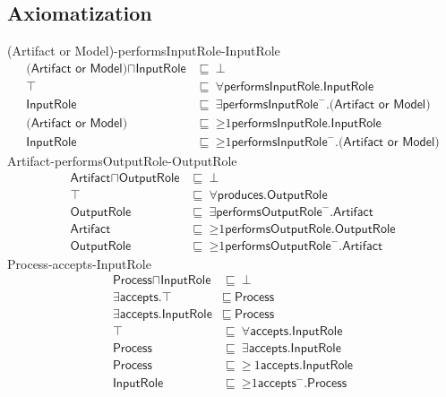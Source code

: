 \subsection{Axiomatization}
\label{axs:2b}
\textsf{(Artifact or Model)}-\textsf{performsInputRole}-\textsf{InputRole}
\begin{align}
\textsf{(Artifact or Model)} \sqcap \textsf{InputRole} &\sqsubseteq~\bot \\ %
\textsf{$\top$} &\sqsubseteq~\forall\textsf{performsInputRole.InputRole} \\ %
\textsf{InputRole} &\sqsubseteq~\exists\textsf{performsInputRole}^-\textsf{.(Artifact or Model)} \\ %
\textsf{(Artifact or Model)} &\sqsubseteq~\mathord{\geq}1\textsf{performsInputRole.InputRole} \\ %
\textsf{InputRole} &\sqsubseteq~\mathord{\geq}1\textsf{performsInputRole}^-\textsf{.(Artifact or Model)} %
\end{align}
\textsf{Artifact}-\textsf{performsOutputRole}-\textsf{OutputRole}
\begin{align}
    \textsf{Artifact} \sqcap \textsf{OutputRole} &\sqsubseteq~\bot \\ %
    \textsf{$\top$} &\sqsubseteq~\forall\textsf{produces.OutputRole} \\ %
    \textsf{OutputRole} &\sqsubseteq~\exists\textsf{performsOutputRole}^-\textsf{.Artifact} \\ %
    \textsf{Artifact} &\sqsubseteq~\mathord{\geq}1\textsf{performsOutputRole.OutputRole} \\ %
    \textsf{OutputRole} &\sqsubseteq~\mathord{\geq}1\textsf{performsOutputRole}^-\textsf{.Artifact} %
\end{align}
\textsf{Process}-\textsf{accepts}-\textsf{InputRole}
\begin{align}
    \textsf{Process} \sqcap \textsf{InputRole} &\sqsubseteq~\bot \\ %
    \exists\textsf{accepts.$\top$} &\sqsubseteq~\textsf{Process} \\ %
    \exists\textsf{accepts.InputRole} &\sqsubseteq~\textsf{Process} \\ %
    \textsf{$\top$} &\sqsubseteq~\forall\textsf{accepts.InputRole} \\ %
    \textsf{Process} &\sqsubseteq~\exists\textsf{accepts.InputRole} \\ %
    \textsf{Process} &\sqsubseteq~\mathord{\geq}~1\textsf{accepts.InputRole} \\ %
    \textsf{InputRole} &\sqsubseteq~\mathord{\geq}1 \textsf{accepts}^-\textsf{.Process} %
\end{align}
